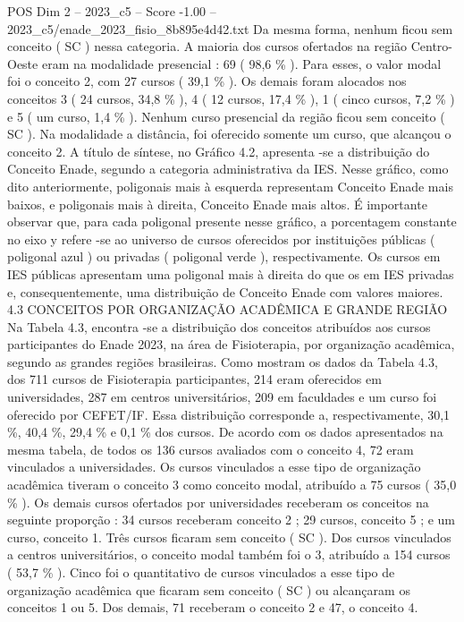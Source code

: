 \begin{textsample}{POS Dim 2 – 2023\_c5 – Score -1.00 – 2023\_c5/enade\_2023\_fisio\_8b895e4d42.txt}
Da mesma forma, nenhum ficou sem conceito ( SC ) nessa categoria.
A maioria dos cursos ofertados na região Centro-Oeste eram na modalidade presencial : 69 ( 98,6 \% ).
Para esses, o valor modal foi o conceito 2, com 27 cursos ( 39,1 \% ).
Os demais foram alocados nos conceitos 3 ( 24 cursos, 34,8 \% ), 4 ( 12 cursos, 17,4 \% ), 1 ( cinco cursos, 7,2 \% ) e 5 ( um curso, 1,4 \% ).
Nenhum curso presencial da região ficou sem conceito ( SC ).
Na modalidade a distância, foi oferecido somente um curso, que alcançou o conceito 2.
A título de síntese, no Gráfico 4.2, apresenta -se a distribuição do Conceito Enade, segundo a categoria administrativa da IES.
Nesse gráfico, como dito anteriormente, poligonais mais à esquerda representam Conceito Enade mais baixos, e poligonais mais à direita, Conceito Enade mais altos.
É importante observar que, para cada poligonal presente nesse gráfico, a porcentagem constante no eixo y refere -se ao universo de cursos oferecidos por instituições públicas ( poligonal azul ) ou privadas ( poligonal verde ), respectivamente.
Os cursos em IES públicas apresentam uma poligonal mais à direita do que os em IES privadas e, consequentemente, uma distribuição de Conceito Enade com valores maiores. 4.3 CONCEITOS POR ORGANIZAÇÃO ACADÊMICA E GRANDE REGIÃO Na Tabela 4.3, encontra -se a distribuição dos conceitos atribuídos aos cursos participantes do Enade 2023, na área de Fisioterapia, por organização acadêmica, segundo as grandes regiões brasileiras.
Como mostram os dados da Tabela 4.3, dos 711 cursos de Fisioterapia participantes, 214 eram oferecidos em universidades, 287 em centros universitários, 209 em faculdades e um curso foi oferecido por CEFET/IF.
Essa distribuição corresponde a, respectivamente, 30,1 \%, 40,4 \%, 29,4 \% e 0,1 \% dos cursos.
De acordo com os dados apresentados na mesma tabela, de todos os 136 cursos avaliados com o conceito 4, 72 eram vinculados a universidades.
Os cursos vinculados a esse tipo de organização acadêmica tiveram o conceito 3 como conceito modal, atribuído a 75 cursos ( 35,0 \% ).
Os demais cursos ofertados por universidades receberam os conceitos na seguinte proporção : 34 cursos receberam conceito 2 ; 29 cursos, conceito 5 ; e um curso, conceito 1.
Três cursos ficaram sem conceito ( SC ).
Dos cursos vinculados a centros universitários, o conceito modal também foi o 3, atribuído a 154 cursos ( 53,7 \% ).
Cinco foi o quantitativo de cursos vinculados a esse tipo de organização acadêmica que ficaram sem conceito ( SC ) ou alcançaram os conceitos 1 ou 5.
Dos demais, 71 receberam o conceito 2 e 47, o conceito 4.

\end{textsample}
